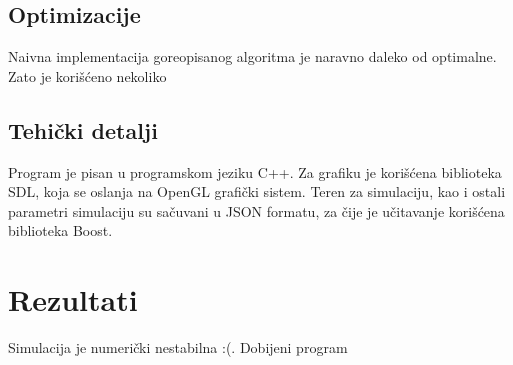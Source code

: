 \documentclass[12pt]{article}
\begin{document}
    \subsection{Optimizacije}
        Naivna implementacija goreopisanog algoritma je naravno daleko od optimalne. Zato je kori\v s\'ceno nekoliko
    \subsection{Tehi\v cki detalji}
        Program je pisan u programskom jeziku C++. Za grafiku je kori\v s\'cena biblioteka SDL, koja se oslanja na OpenGL grafi\v cki sistem.
        Teren za simulaciju, kao i ostali parametri simulaciju su sa\v cuvani u JSON formatu, za \v cije je u\v citavanje kori\v s\'cena biblioteka Boost.
    
        
    \section{Rezultati}
        Simulacija je numeri\v cki nestabilna :(. Dobijeni program
\newpage


\end{document}
